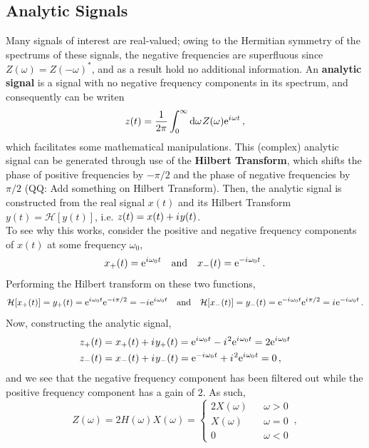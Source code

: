 \subsection{Analytic Signals}
%
Many signals of interest are real-valued; owing to the Hermitian symmetry
of the spectrums of these signals, the negative frequencies are superfluous
since $Z(\omega) = Z(-\omega)^*$, and as a result hold no additional
information. An \textbf{analytic signal} is a signal with no negative
frequency components in its spectrum, and consequently can be writen
%
\begin{displaymath}
  z(t) = \frac{1}{2\pi}\int_0^\infty \mathrm{d}\omega\mkern1muZ(\omega)\mathrm{e}^{{i\mkern1mu}\omega t} \,,
\end{displaymath}
%
which facilitates some mathematical manipulations. This (complex) analytic
signal can be generated through use of the \textbf{Hilbert Transform}, which
shifts the phase of positive frequencies by $-\pi/2$ and the phase of negative
frequencies by $\pi/2$ (QQ: Add something on Hilbert Transform). Then, the
analytic signal is constructed from the real signal $x(t)$ and its Hilbert
Transform $y(t) = \mathcal{H}[y(t)]$, i.e. $z(t) = x(t) + {i\mkern1mu} y(t)$.\\
%
To see why this works, consider the positive and negative frequency
components of $x(t)$ at some frequency $\omega_0$,
%
\begin{displaymath}
  x_+(t) = \mathrm{e}^{{i\mkern1mu}\omega_0 t} \quad\mathrm{and}\quad x_-(t) = \mathrm{e}^{-{i\mkern1mu}\omega_0 t} \,.
\end{displaymath}
%
Performing the Hilbert transform on these two functions,
%
\begin{displaymath}
  \mathcal{H}[x_+(t)] = y_+(t) = \mathrm{e}^{{i\mkern1mu}\omega_0 t}\mathrm{e}^{-{i\mkern1mu}\pi/2} = -{i\mkern1mu}\mathrm{e}^{{i\mkern1mu}\omega_0 t}
  \quad\mathrm{and}\quad
  \mathcal{H}[x_-(t)] = y_-(t) = \mathrm{e}^{-{i\mkern1mu}\omega_0 t}\mathrm{e}^{{i\mkern1mu}\pi/2} = {i\mkern1mu}\mathrm{e}^{-{i\mkern1mu}\omega_0 t} \,.
\end{displaymath}
%
Now, constructing the analytic signal,
%
\begin{align*}
  z_+(t) &= x_+(t) + {i\mkern1mu} y_+(t) = \mathrm{e}^{{i\mkern1mu}\omega_0 t} - {i\mkern1mu}^2\mathrm{e}^{{i\mkern1mu}\omega_0 t} = 2\mathrm{e}^{{i\mkern1mu}\omega_0 t} \\
  z_-(t) &= x_-(t) + {i\mkern1mu} y_-(t) = \mathrm{e}^{-{i\mkern1mu}\omega_0 t} + {i\mkern1mu}^2\mathrm{e}^{{i\mkern1mu}\omega_0 t} = 0 \,,
\end{align*}
%
and we see that the negative frequency component has been filtered out while
the positive frequency component has a gain of $2$. As such,
%
\begin{displaymath}
  Z(\omega) = 2H(\omega)X(\omega) = \left\{\begin{array}{ccl}
      2X(\omega) & & \omega > 0 \\
      X(\omega) & & \omega = 0 \\
      0 & & \omega < 0
    \end{array}\right.\,,
\end{displaymath}
